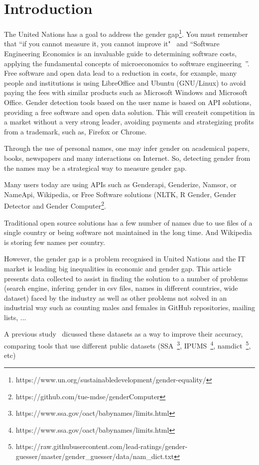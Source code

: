 \documentclass[a4paper]{article}
\begin{document}
\section{Introduction}
The United Nations has a goal to address the gender
gap\footnote{https://www.un.org/sustainabledevelopment/gender-equality/}.
You must remember that ``if you cannot measure it, you cannot
improve it"~\cite{thompson1833electrical} and ``Software
Engineering Economics is an invaluable guide to determining
software costs, applying the fundamental concepts of microeconomics
to software engineering~\cite{barry1981software}''. Free software and open
data lead to a reduction in costs, for example, many people and
institutions is using LibreOffice and Ubuntu (GNU/Linux) to avoid paying
the fees with similar products such as Microsoft Windows and Microsoft
Office. Gender detection tools based on the user name is based on API
solutions, providing a free software and open data solution. This will
createit competition in a market without a very strong leader, avoiding
payments and strategizing profits from a trademark, such as, Firefox or
Chrome.

Through the use of personal names, one may infer gender on
academical papers, books, newspapers and many interactions on Internet.
So, detecting gender from the names may be a strategical way to
measure gender gap.

Many users today are using APIs such as Genderapi, Genderize,
Namsor, or NameApi, Wikipedia, or Free Software solutions
(NLTK\cite{loper2002nltk}, R Gender, Gender Detector and Gender
Computer\footnote{https://github.com/tue-mdse/genderComputer}.

Traditional open source solutions has a few number of names due to
use files of a single country or being software not maintained in
the long time. And Wikipedia is storing few names per country.

However, the gender gap is a problem recognised in United Nations and
the IT market is leading big inequalities in economic and gender gap.
This article presents data collected to assist in finding the solution
to a number of problems (search engine, infering gender in csv files,
names in different countries, wide dataset) faced by
the industry as well as other problems not solved in an industrial way
such as counting males and females in GitHub repositories, mailing lists,
...

A previous study~\cite{karimi2016inferring} dicussed these datasets as
a way to improve their accuracy, comparing tools that use different
public datasets (SSA~\footnote{https://www.ssa.gov/oact/babynames/limits.html},
IPUMS~\footnote{https://www.ssa.gov/oact/babynames/limits.html},
namdict~\footnote{https://raw.githubusercontent.com/lead-ratings/gender-guesser/master/gender_guesser/data/nam_dict.txt}, etc)
\end{document}
